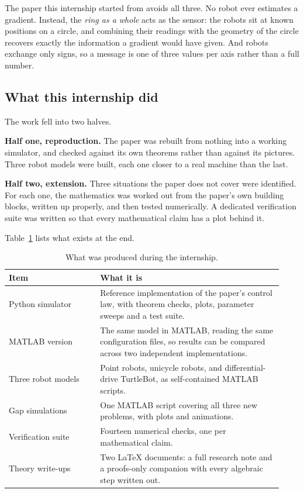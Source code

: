 \documentclass[11pt,a4paper]{article}
\begin{document}
The paper this internship started from \cite{du2024} avoids all three. No robot ever estimates a
gradient. Instead, the \emph{ring as a whole} acts as the sensor: the robots sit at known positions
on a circle, and combining their readings with the geometry of the circle recovers exactly the
information a gradient would have given. And robots exchange only signs, so a message is one of
three values per axis rather than a full number.

\subsection{What this internship did}

The work fell into two halves.

\textbf{Half one, reproduction.} The paper was rebuilt from nothing into a working simulator, and
checked against its own theorems rather than against its pictures. Three robot models were built,
each one closer to a real machine than the last.

\textbf{Half two, extension.} Three situations the paper does not cover were identified. For each
one, the mathematics was worked out from the paper's own building blocks, written up properly, and
then tested numerically. A dedicated verification suite was written so that every mathematical
claim has a plot behind it.

Table~\ref{tab:deliverables} lists what exists at the end.

\begin{table}[H]
\centering
\caption{What was produced during the internship.}
\label{tab:deliverables}
\small
\begin{tabular}{@{}p{0.31\linewidth}p{0.62\linewidth}@{}}
\toprule
Item & What it is \\
\midrule
Python simulator & Reference implementation of the paper's control law, with theorem checks,
plots, parameter sweeps and a test suite. \\
MATLAB version & The same model in MATLAB, reading the same configuration files, so results can be
compared across two independent implementations. \\
Three robot models & Point robots, unicycle robots, and differential-drive TurtleBot, as
self-contained MATLAB scripts. \\
Gap simulations & One MATLAB script covering all three new problems, with plots and animations. \\
Verification suite & Fourteen numerical checks, one per mathematical claim. \\
Theory write-ups & Two LaTeX documents: a full research note and a proofs-only companion with every
algebraic step written out. \\
\bottomrule
\end{tabular}
\end{table}
\end{document}
